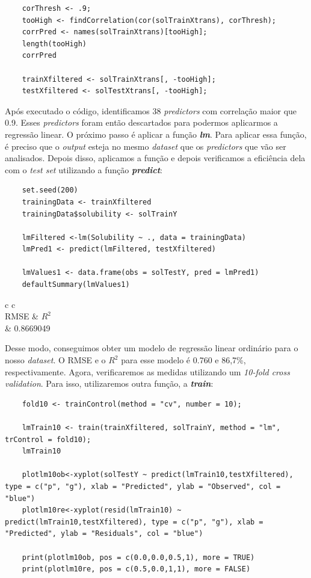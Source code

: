 \documentclass[a4paper,11pt]{article}
\begin{document}
	\begin{verbatim}
	corThresh <- .9;
	tooHigh <- findCorrelation(cor(solTrainXtrans), corThresh);
	corrPred <- names(solTrainXtrans)[tooHigh];
	length(tooHigh)
	corrPred
	
	trainXfiltered <- solTrainXtrans[, -tooHigh];
	testXfiltered <- solTestXtrans[, -tooHigh];
	\end{verbatim}
	Após executado o código, identificamos 38 \textit{predictors} com correlação maior que 0.9. Esses \textit{predictors} foram então descartados para podermos aplicarmos a regressão linear. O próximo passo é aplicar a função \textit{\textbf{lm}}. Para aplicar essa função, é preciso que o \textit{output} esteja no mesmo \textit{dataset} que os \textit{predictors} que vão ser analisados. Depois disso, aplicamos a função e depois verificamos a eficiência dela com o \textit{test set} utilizando a função \textit{\textbf{predict}}:
	\begin{verbatim}
	set.seed(200)
	trainingData <- trainXfiltered
	trainingData$solubility <- solTrainY
	
	lmFiltered <-lm(Solubility ~ ., data = trainingData)
	lmPred1 <- predict(lmFiltered, testXfiltered)
	
	lmValues1 <- data.frame(obs = solTestY, pred = lmPred1)
	defaultSummary(lmValues1)
	\end{verbatim}
	\begin{center}
		\begin{tabular}{c c}
			\\
			\hline
			RMSE & $R^{2}$ \\
			 & 0.8669049
		\end{tabular}
	\end{center}
	Desse modo, conseguimos obter um modelo de regressão linear ordinário para o nosso \textit{dataset}. O RMSE e o $R^{2}$ para esse modelo é 0.760 e 86,7\%, respectivamente. Agora, verificaremos as medidas utilizando um \textit{10-fold cross validation}. Para isso, utilizaremos outra função, a \textit{\textbf{train}}:
	\begin{verbatim}
	fold10 <- trainControl(method = "cv", number = 10);
	
	lmTrain10 <- train(trainXfiltered, solTrainY, method = "lm", trControl = fold10);
	lmTrain10
	
	plotlm10ob<-xyplot(solTestY ~ predict(lmTrain10,testXfiltered), type = c("p", "g"), xlab = "Predicted", ylab = "Observed", col = "blue")
	plotlm10re<-xyplot(resid(lmTrain10) ~ predict(lmTrain10,testXfiltered), type = c("p", "g"), xlab = "Predicted", ylab = "Residuals", col = "blue")

	print(plotlm10ob, pos = c(0.0,0.0,0.5,1), more = TRUE)
	print(plotlm10re, pos = c(0.5,0.0,1,1), more = FALSE)
	\end{verbatim}
\end{document}
